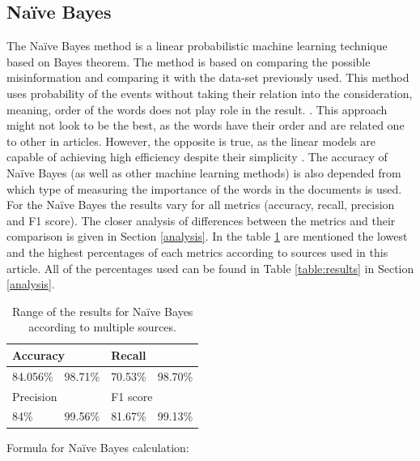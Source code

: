 \documentclass[11pt ,english,a4paper]{article}
\begin{document}
\subsection{Naïve Bayes}\label{nb}
The Naïve Bayes method is a linear probabilistic machine learning technique based on Bayes theorem. The method is based on comparing the possible misinformation and comparing it with the data-set previously used. This method uses probability of the events without taking their relation into the consideration, meaning, order of the words does not play role in the result. \cite{sha20mach}. This approach might not look to be the best, as the words have their order and are related one to other in articles. However, the opposite is true, as the linear models are capable of achieving high efficiency despite their simplicity \cite{pod19mach}. The accuracy of Naïve Bayes (as well as other machine learning methods) is also depended from which type of measuring the importance of the words in the documents is used. For the Naïve Bayes the results vary for all metrics (accuracy, recall, precision and F1 score). The closer analysis of  differences between the metrics and their comparison is given in Section \ref{analysis}. In the table \ref{table:nb} are mentioned the lowest and the highest percentages of each metrics according to sources used in this article. All of the percentages used can be found in Table \ref{table:results} in Section \ref{analysis}.

\begin{table}[H]
\centering
\begin{tabular}{|ll|ll|}
\hline
\multicolumn{2}{|l|}{Accuracy}           & \multicolumn{2}{l|}{Recall}      \\ \hline
\multicolumn{1}{|l|}{84.056\%\cite{sha20mach}} & 98.71\%\cite{bar21health} & \multicolumn{1}{l|}{70.53\%\cite{sha20mach}} & 98.70\%\cite{bar21health} \\ \hline
\multicolumn{2}{|l|}{Precision}      & \multicolumn{2}{l|}{F1 score}          \\ \hline
\multicolumn{1}{|l|}{84\%\cite{chap22unmask}} & 99.56\%\cite{bar21health} & \multicolumn{1}{l|}{81.67\%\cite{sha20mach}} & 99.13\%\cite{bar21health} \\ \hline
\end{tabular}
\caption{\centering Range of the results for Naïve Bayes according to multiple sources.}
\label{table:nb}
\end{table}


Formula for Naïve Bayes calculation: \cite{sha20mach}
\end{document}
